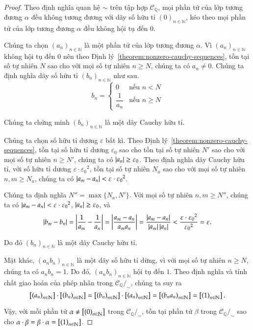 \begin{proof}
    Theo định nghĩa quan hệ $\sim$ trên tập hợp $\mathscr{C}_{\mathbb{Q}}$, mọi phần tử của lớp tương đương $\alpha$ đều không tương đương với dãy số hữu tỉ ${(0)}_{n\in\mathbb{N}}$, kéo theo mọi phần tử của lớp tương đương $\alpha$ đều không hội tụ đến $0$.

    Chúng ta chọn ${(a_{n})}_{n\in\mathbb{N}}$ là một phần tử của lớp tương đương $\alpha$. Vì ${(a_{n})}_{n\in\mathbb{N}}$ không hội tụ đến $0$ nên theo Định lý~\ref{theorem:nonzero-cauchy-sequences}, tồn tại số tự nhiên $N$ sao cho với mọi số tự nhiên $n\geq N$, chúng ta có $a_{n}\ne 0$. Chúng ta định nghĩa dãy số hữu tỉ ${(b_{n})}_{n\in\mathbb{N}}$ như sau.
    \[
        b_{n} = \begin{cases}
            0                & \text{nếu $n < N$}   \\
            \dfrac{1}{a_{n}} & \text{nếu $n\geq N$}
        \end{cases}
    \]

    Chúng ta chứng minh ${(b_{n})}_{n\in\mathbb{N}}$ là một dãy Cauchy hữu tỉ.

    Chúng ta chọn số hữu tỉ dương $\varepsilon$ bất kì. Theo Định lý~\ref{theorem:nonzero-cauchy-sequences}, tồn tại số hữu tỉ dương $\varepsilon_{0}$ sao cho tồn tại số tự nhiên $N'$ sao cho với mọi số tự nhiên $n\geq N'$, chúng ta có $\left\vert{a_{n}}\right\vert\geq \varepsilon_{0}$. Theo định nghĩa dãy Cauchy hữu tỉ, với số hữu tỉ dương $\varepsilon\cdot{\varepsilon_{0}}^{2}$, tồn tại số tự nhiên $N_{a}$ sao cho với mọi số tự nhiên $n, m\geq N_{a}$, chúng ta có $\left\vert{a_{m} - a_{n}}\right\vert < \varepsilon\cdot{\varepsilon_{0}}^{2}$.

    Chúng ta định nghĩa $N'' = \max\{ N_{a}, N' \}$. Với mọi số tự nhiên $n, m\geq N''$, chúng ta có $\left\vert{a_{m} - a_{n}}\right\vert < \varepsilon\cdot{\varepsilon_{0}}^{2}$, $\left\vert{a_{n}}\right\vert\geq\varepsilon_{0}$, và
    \[
        \left\vert{b_{m} - b_{n}}\right\vert = \left\vert{\frac{1}{a_{m}} - \frac{1}{a_{n}}}\right\vert = \left\vert{\frac{a_{m} - a_{n}}{a_{m}a_{n}}}\right\vert = \frac{\left\vert{a_{m} - a_{n}}\right\vert}{\left\vert{a_{m}}\right\vert\left\vert{a_{n}}\right\vert} < \frac{\varepsilon\cdot{\varepsilon_{0}}^{2}}{{\varepsilon_{0}}^{2}} = \varepsilon.
    \]

    Do đó ${(b_{n})}_{n\in\mathbb{N}}$ là một dãy Cauchy hữu tỉ.

    Mặt khác, ${(a_{n}b_{n})}_{n\in\mathbb{N}}$ là một dãy số hữu tỉ dừng, vì với mọi số tự nhiên $n\geq N$, chúng ta có $a_{n}b_{n} = 1$. Do đó, ${(a_{n}b_{n})}_{n\in\mathbb{N}}$ hội tụ đến $1$. Theo định nghĩa và tính chất giao hoán của phép nhân trong $\mathscr{C}_{\mathbb{Q}}/_{\sim}$, chúng ta suy ra
    \[
        \left[{\left({a_{n}}\right)}_{{n}\in\mathbb{N}}\right]\cdot\left[{\left({b_{n}}\right)}_{{n}\in\mathbb{N}}\right] = \left[{\left({b_{n}}\right)}_{{n}\in\mathbb{N}}\right]\cdot\left[{\left({a_{n}}\right)}_{{n}\in\mathbb{N}}\right] = \left[{\left({b_{n}a_{n}}\right)}_{{n}\in\mathbb{N}}\right] = \left[{\left({1}\right)}_{{n}\in\mathbb{N}}\right].
    \]

    Vậy, với mỗi phần tử $\alpha\ne \left[{\left({0}\right)}_{{n}\in\mathbb{N}}\right]$ trong $\mathscr{C}_{\mathbb{Q}}/_{\sim}$, tồn tại phần tử $\beta$ trong $\mathscr{C}_{\mathbb{Q}}/_{\sim}$ sao cho $\alpha\cdot\beta = \beta\cdot\alpha = \left[{\left({1}\right)}_{{n}\in\mathbb{N}}\right]$.
\end{proof}

